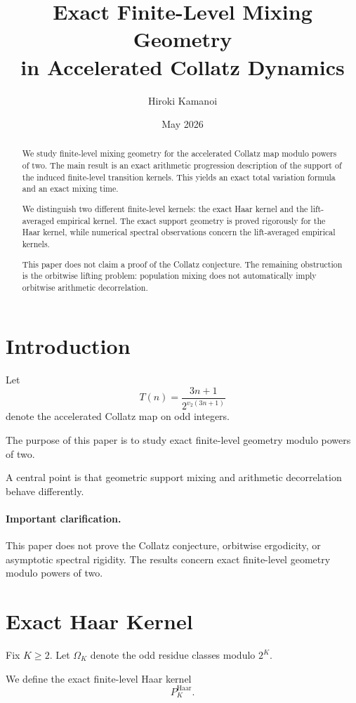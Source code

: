 \documentclass[11pt]{article}
\title{Exact Finite-Level Mixing Geometry\\
in Accelerated Collatz Dynamics}
\author{Hiroki Kamanoi}
\date{May 2026}
\begin{document}
\maketitle

\begin{abstract}
We study finite-level mixing geometry for the accelerated Collatz map modulo powers of two.
The main result is an exact arithmetic progression description of the support of the induced finite-level transition kernels.
This yields an exact total variation formula and an exact mixing time.

We distinguish two different finite-level kernels:
the exact Haar kernel and the lift-averaged empirical kernel.
The exact support geometry is proved rigorously for the Haar kernel,
while numerical spectral observations concern the lift-averaged empirical kernels.

This paper does not claim a proof of the Collatz conjecture.
The remaining obstruction is the orbitwise lifting problem:
population mixing does not automatically imply orbitwise arithmetic decorrelation.
\end{abstract}

\section{Introduction}

Let
\[
T(n)=\frac{3n+1}{2^{v_2(3n+1)}}
\]
denote the accelerated Collatz map on odd integers.

The purpose of this paper is to study exact finite-level geometry modulo powers of two.

A central point is that geometric support mixing and arithmetic decorrelation behave differently.

\paragraph{Important clarification.}
This paper does not prove the Collatz conjecture,
orbitwise ergodicity,
or asymptotic spectral rigidity.
The results concern exact finite-level geometry modulo powers of two.

\section{Exact Haar Kernel}

Fix \(K\ge2\).
Let \(\Omega_K\) denote the odd residue classes modulo \(2^K\).

We define the exact finite-level Haar kernel
\[
P_K^{\mathrm{Haar}}.
\]
\end{document}

